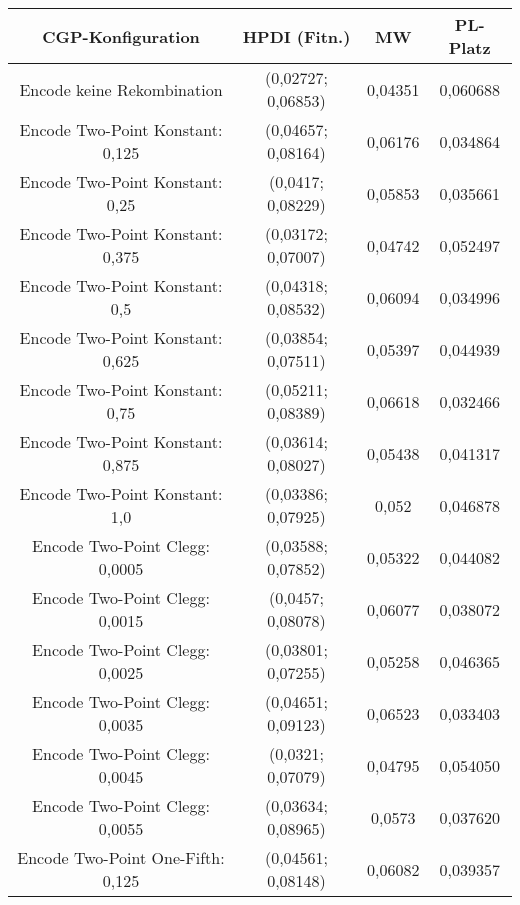 \begin{table}[H]
	\centering
	\begin{tabular}{c | c | c | c}
		\textbf{CGP-Konfiguration} & \textbf{HPDI (Fitn.)} & \textbf{MW} & \textbf{PL-Platz}\\
		\hline
		Encode keine Rekombination & (0,02727; 0,06853) & \color{Green}0,04351\color{black} & \color{Green}0,060688\color{black}\\
		\hline
		\hline
		Encode Two-Point Konstant: 0,125 & (0,04657; 0,08164) & \color{red}0,06176\color{black} & \color{red}0,034864\color{black}\\
		\hline
		Encode Two-Point Konstant: 0,25 & (0,0417; 0,08229) & 0,05853 & 0,035661\\
		\hline
		Encode Two-Point Konstant: 0,375 & (0,03172; 0,07007) & \color{Green}0,04742\color{black} & 0,052497\\
		\hline
		Encode Two-Point Konstant: 0,5 & (0,04318; 0,08532) & 0,06094 & 0,034996\\
		\hline
		Encode Two-Point Konstant: 0,625 & (0,03854; 0,07511) & 0,05397 & 0,044939\\
		\hline
		Encode Two-Point Konstant: 0,75 & \color{Green}(0,05211; 0,08389)\color{black} & \color{red}0,06618\color{black} & \color{red}0,032466\color{black}\\
		\hline
		Encode Two-Point Konstant: 0,875 & \color{red}(0,03614; 0,08027)\color{black} & 0,05438 & 0,041317\\
		\hline
		Encode Two-Point Konstant: 1,0 & \color{red}(0,03386; 0,07925)\color{black} & 0,052 & 0,046878\\
		\hline
		\hline
		Encode Two-Point Clegg: 0,0005 & (0,03588; 0,07852) & 0,05322 & 0,044082\\
		\hline
		Encode Two-Point Clegg: 0,0015 & (0,0457; 0,08078) & 0,06077 & 0,038072\\
		\hline
		Encode Two-Point Clegg: 0,0025 & (0,03801; 0,07255) & 0,05258 & 0,046365\\
		\hline
		Encode Two-Point Clegg: 0,0035 & (0,04651; 0,09123) & \color{red}0,06523\color{black} & \color{red}0,033403\color{black}\\
		\hline
		Encode Two-Point Clegg: 0,0045 & (0,0321; 0,07079) &\color{Green} 0,04795\color{black} &\color{Green} 0,054050\color{black}\\
		\hline
		Encode Two-Point Clegg: 0,0055 & \color{red}(0,03634; 0,08965)\color{black} & 0,0573 & 0,037620\\
		\hline
		\hline
		Encode Two-Point One-Fifth: 0,125 & (0,04561; 0,08148) & 0,06082 & 0,039357\\

\end{tabular}
\end{table}
